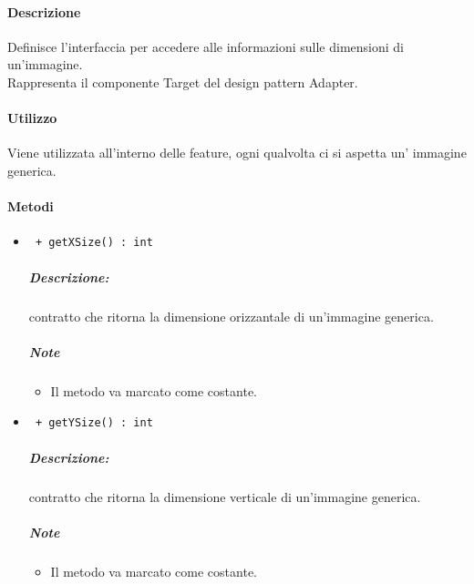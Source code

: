\paragraph{Descrizione }
Definisce l'interfaccia per accedere alle informazioni sulle dimensioni di un'immagine.
\\Rappresenta il componente Target del design pattern\g{} Adapter.

\paragraph{Utilizzo \\}
Viene utilizzata all'interno delle feature, ogni qualvolta ci si aspetta un' immagine generica.

\color{black}
\paragraph{Metodi}
	\begin{itemize}
		\item \color{blue}\verb! + getXSize() : int !\\
		\color{black}
		\subparagraph{Descrizione:} contratto che ritorna la dimensione orizzantale di un'immagine generica.
		\subparagraph{Note}
			\begin{itemize}
				\item Il metodo va marcato come costante.
			\end{itemize}
			
		\item \color{blue}\verb! + getYSize() : int !
		\color{black}
		\subparagraph{Descrizione:} contratto che ritorna la dimensione verticale di un'immagine generica.
		\subparagraph{Note}
			\begin{itemize}
				\item Il metodo va marcato come costante.
			\end{itemize}

			
	\end{itemize}

\pagebreak
\color{black}
